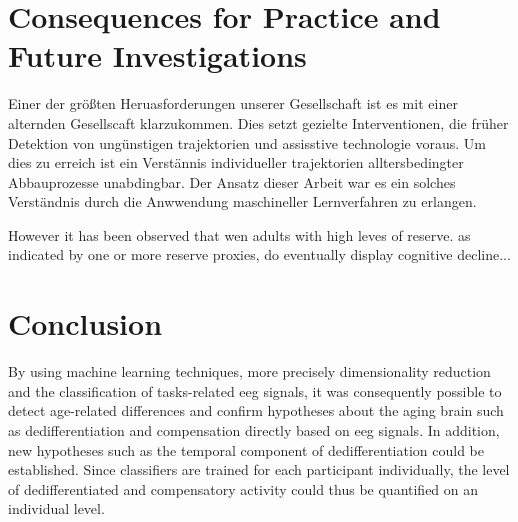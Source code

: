 \section{Consequences for Practice and Future Investigations}
Einer der größten Heruasforderungen unserer Gesellschaft ist es mit einer alternden Gesellscaft klarzukommen. Dies setzt gezielte Interventionen, die früher Detektion von ungünstigen trajektorien und assisstive technologie voraus. Um dies zu erreich ist ein Verstännis individueller trajektorien alltersbedingter Abbauprozesse unabdingbar. Der Ansatz dieser Arbeit war es ein solches Verständnis durch die Anwwendung maschineller Lernverfahren zu erlangen. 
 
However it has been observed that wen adults with high leves of reserve. as indicated by one or more reserve proxies, do eventually display cognitive decline...


\section{Conclusion}

By using machine learning techniques, more precisely dimensionality reduction and the classification of tasks-related \gls{eeg} signals, it was consequently possible to detect age-related differences and confirm hypotheses about the aging brain such as dedifferentiation and compensation directly based on \gls{eeg} signals. In addition, new hypotheses such as the temporal component of dedifferentiation could be established.  Since classifiers are trained for each participant individually, the level of dedifferentiated and compensatory activity could thus be quantified on an individual level. 